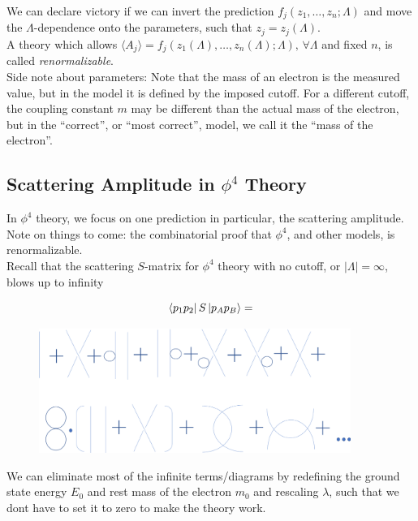\noindent We can declare victory if we can invert the prediction $f_j (z_1, \dots, z_n; \Lambda)$ and move the $\Lambda$-dependence onto the parameters, such that $z_j = z_j (\Lambda)$. \\

\noindent A theory which allows $\langle A_j \rangle = f_j (z_1 (\Lambda), \dots , z_n (\Lambda); \Lambda), \, \forall \Lambda$ and fixed $n$, is called \textit{renormalizable}. \\

\noindent Side note about parameters: Note that the mass of an electron is the measured value, but in the model it is defined by the imposed cutoff. For a different cutoff, the coupling constant $m$ may be different than the actual mass of the electron, but in the ``correct'', or ``most correct'', model, we call it the ``mass of the electron''. \\

\subsection*{Scattering Amplitude in $\phi^4$ Theory}

\noindent In $\phi^4$ theory, we focus on one prediction in particular, the scattering amplitude. \\

\noindent Note on things to come: the combinatorial proof that $\phi^4$, and other models, is renormalizable. \\

\noindent Recall that the scattering $S$-matrix for $\phi^4$ theory with no cutoff, or $|\Lambda| = \infty$, blows up to infinity

\begin{equation}
\bra{p_1 p_2} S \ket{ p_A p_B} =
\end{equation}

\begin{figure}[H]
	\centering
	\includegraphics[width=4in]{images/phi4_diagrams.png}
\end{figure}

\noindent We can eliminate most of the infinite terms/diagrams by redefining the ground state energy $E_0$ and rest mass of the electron $m_0$ and rescaling $\lambda$, such that we dont have to set it to zero to make the theory work. \\

